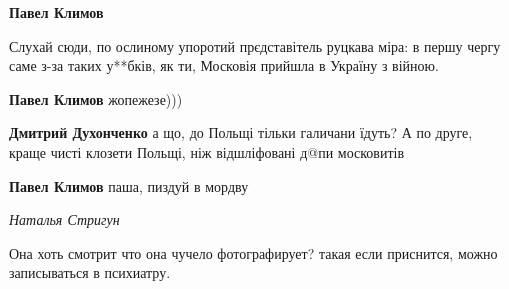 \begin{itemize}
\begin{itemize}
\textbf{Павел Климов} 

Слухай сюди, по ослиному упоротий прєдставітель руцкава
міра: в першу чергу саме з-за таких у**бків, як ти, Московія прийшла в Україну
з війною.


\textbf{Павел Климов} жопежезе)))


\textbf{Дмитрий Духонченко} а що, до Польщі тільки галичани їдуть? А по друге, краще чисті клозети Польщі, ніж відшліфовані д@пи московитів


\textbf{Павел Климов} паша, пиздуй в мордву
\end{itemize}

\emph{Наталья Стригун}

Она хоть смотрит что она чучело фотографирует? такая если приснится, можно записываться в психиатру.

\end{itemize}

